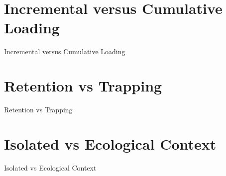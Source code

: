 \documentclass[bigger]{beamer}
\begin{document}

\section{Incremental versus Cumulative Loading}
\begin{frame}{Incremental versus Cumulative Loading}
  \begin{center}
    \incrementalcumulativeloads[1.1]
  \end{center}
\end{frame}


\section{Retention vs Trapping}
\begin{frame}{Retention vs Trapping}
  \begin{center}
    \retentiontrapping[1.1]
  \end{center}
\end{frame}


\section{Isolated vs Ecological Context}
\begin{frame}{Isolated vs Ecological Context}
  \begin{columns}[b]
  
  \begin{column}[b]{0.32\textwidth}
    \isolated[0.86]
    \vspace{0pt}
  \end{column}
  
  \begin{column}{0.32\textwidth}
    \secondary[1.1]
    \vspace{0pt}
  \end{column}
  
  \begin{column}[b]{0.35\textwidth}
    \secondarypluswatershed[1.1]
    \vspace{-2pt}
  \end{column}
  
  \end{columns}
\end{frame}

\end{document}
